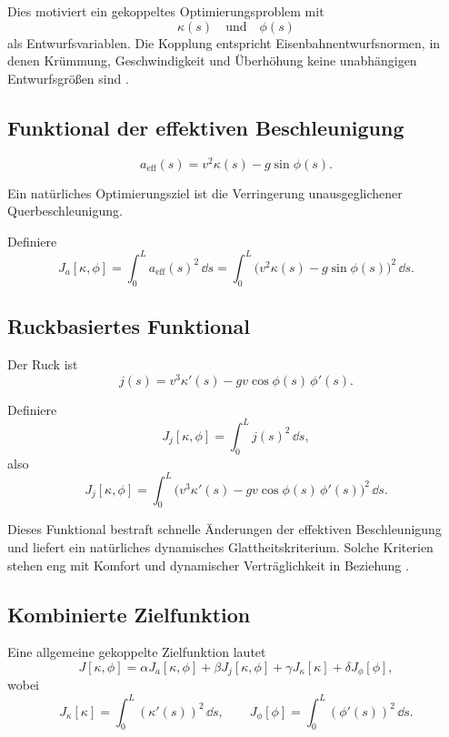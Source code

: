 Dies motiviert ein gekoppeltes Optimierungsproblem mit
\[
\kappa(s)\quad\text{und}\quad\phi(s)
\]
als Entwurfsvariablen. Die Kopplung entspricht Eisenbahnentwurfsnormen, in
denen Krümmung, Geschwindigkeit und Überhöhung keine unabhängigen
Entwurfsgrößen sind \cite{EN13803_2017,Klein1998Trassierung}.

\subsection{Funktional der effektiven Beschleunigung}
\begin{definition}
\[
a_{\mathrm{eff}}(s)=v^2\kappa(s)-g\sin\phi(s).
\]
\end{definition}
Ein natürliches Optimierungsziel ist die Verringerung unausgeglichener
Querbeschleunigung.
\begin{definition}
Definiere
\[
J_a[\kappa,\phi]
=\int_0^L a_{\mathrm{eff}}(s)^2\,\dd s
=\int_0^L\bigl(v^2\kappa(s)-g\sin\phi(s)\bigr)^2\,\dd s.
\]
\end{definition}

\subsection{Ruckbasiertes Funktional}
\begin{definition}[Ruck]
Der Ruck ist
\[
j(s)=v^3\kappa'(s)-gv\cos\phi(s)\,\phi'(s).
\]
\end{definition}
\begin{definition}[Ruckfunktional]
Definiere
\[
J_j[\kappa,\phi]=\int_0^L j(s)^2\,\dd s,
\]
also
\[
J_j[\kappa,\phi]=\int_0^L
\bigl(v^3\kappa'(s)-gv\cos\phi(s)\,\phi'(s)\bigr)^2\,\dd s.
\]
\end{definition}

Dieses Funktional bestraft schnelle Änderungen der effektiven Beschleunigung
und liefert ein natürliches dynamisches Glattheitskriterium. Solche Kriterien
stehen eng mit Komfort und dynamischer Verträglichkeit in Beziehung
\cite{EN13803_2017,BrustadDalmo2020Review}.

\subsection{Kombinierte Zielfunktion}
\begin{definition}
Eine allgemeine gekoppelte Zielfunktion lautet
\[
J[\kappa,\phi]
=\alpha J_a[\kappa,\phi]+\beta J_j[\kappa,\phi]
+\gamma J_\kappa[\kappa]+\delta J_\phi[\phi],
\]
wobei
\[
J_\kappa[\kappa]=\int_0^L(\kappa'(s))^2\,\dd s,
\qquad
J_\phi[\phi]=\int_0^L(\phi'(s))^2\,\dd s.
\]
\end{definition}

